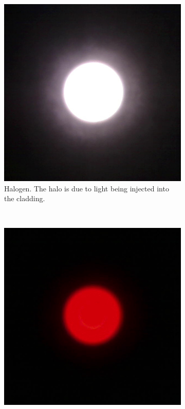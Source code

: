 \documentclass[a4paper, 12pt]{paper}
\begin{document}
\begin{figure}[H]
    \centering
    \begin{subfigure}[t]{0.30\textwidth}
        \includegraphics[width=\textwidth]{img/halogen-injection.jpg}
        \caption{Halogen. The halo is due to light being injected into the cladding.}
    \end{subfigure}
    ~
    \begin{subfigure}[t]{0.30\textwidth}
        \includegraphics[width=\textwidth]{img/led-injection.jpg}

\end{subfigure}
\end{figure}
\end{document}
